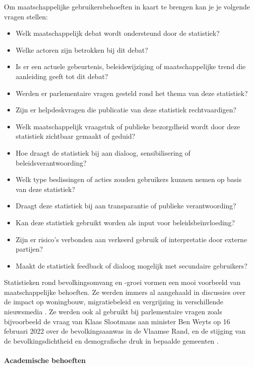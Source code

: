 \documentclass[\mainfiledir/00_handleiding_statistiekproductie.tex]{subfiles}
\begin{document}
Om maatschappelijke gebruikersbehoeften in kaart te brengen kan je je volgende vragen stellen:
\begin{itemize}[nosep]
    \item Welk maatschappelijk debat wordt ondersteund door de statistiek?
    \item Welke actoren zijn betrokken bij dit debat?
    \item Is er een actuele gebeurtenis, beleidswijziging of maatschappelijke trend die aanleiding geeft tot dit debat?
    \item Werden er parlementaire vragen gesteld rond het thema van deze statistiek?
    \item Zijn er helpdeskvragen die publicatie van deze statistiek rechtvaardigen? 
    \item Welk maatschappelijk vraagstuk of publieke bezorgdheid wordt door deze statistiek zichtbaar gemaakt of geduid?
    \item Hoe draagt de statistiek bij aan dialoog, sensibilisering of beleidsverantwoording?
    \item Welk type beslissingen of acties zouden gebruikers kunnen nemen op basis van deze statistiek?
    \item Draagt deze statistiek bij aan transparantie of publieke verantwoording?
    \item Kan deze statistiek gebruikt worden als input voor beleidsbeïnvloeding?
    \item Zijn er risico’s verbonden aan verkeerd gebruik of interpretatie door externe partijen?
    \item Maakt de statistiek feedback of dialoog mogelijk met secundaire gebruikers?
\end{itemize}

Statistieken rond bevolkingsomvang en -groei vormen een mooi voorbeeld van maatschappelijke behoeften. Ze werden immers al aangehaald in discussies over de impact op woningbouw, migratiebeleid en vergrijzing in verschillende nieuwsmedia \parencite[zoals bijvoorbeeld in][]{DeStandaard2020Tegen}. Ze werden ook al gebruikt bij parlementaire vragen zoals bijvoorbeeld de vraag van Klaas Slootmans aan minister Ben Weyts op 16 februari 2022 over de bevolkingsaanwas in de Vlaamse Rand, en de stijging van de bevolkingsdichtheid en demografische druk in bepaalde gemeenten \parencite[zie][]{VlaamsParlement2025Verslag1608376}.


\paragraph{Academische behoeften}
\end{document}
